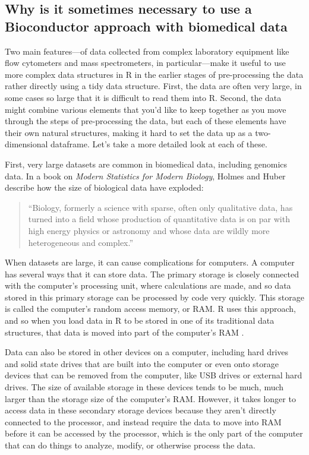 \documentclass[]{tufte-book}
\begin{document}
\subsection{Why is it sometimes necessary to use a Bioconductor approach with biomedical data}\label{why-is-it-sometimes-necessary-to-use-a-bioconductor-approach-with-biomedical-data}

Two main features---of data collected from complex laboratory equipment like
flow cytometers and mass spectrometers, in particular---make it useful to use
more complex data structures in R in the earlier stages of pre-processing the
data rather directly using a tidy data structure. First, the data are often very
large, in some cases so large that it is difficult to read them into R. Second,
the data might combine various elements that you'd like to keep together as you
move through the steps of pre-processing the data, but each of these elements
have their own natural structures, making it hard to set the data up as a
two-dimensional dataframe. Let's take a more detailed look at each of these.

First, very large datasets are common in biomedical data, including genomics
data. In a book on \emph{Modern Statistics for Modern Biology}, Holmes and Huber
describe how the size of biological data have exploded:

\begin{quote}
``Biology, formerly a science with sparse, often only qualitative data, has
turned into a field whose production of quantitative data is on par with high
energy physics or astronomy and whose data are wildly more heterogeneous and
complex.'' \citep{holmes2018modern}
\end{quote}

When datasets are large, it can cause complications for computers. A computer
has several ways that it can store data. The primary storage is closely
connected with the computer's processing unit, where calculations are made, and
so data stored in this primary storage can be processed by code very quickly.
This storage is called the computer's random access memory, or RAM. R uses this
approach, and so when you load data in R to be stored in one of its traditional
data structures, that data is moved into part of the computer's RAM
\citep{burns2011r, gillespie2016efficient}.

Data can also be stored in other devices on a computer, including hard drives
and solid state drives that are built into the computer or even onto storage
devices that can be removed from the computer, like USB drives or external hard
drives. The size of available storage in these devices tends to be much, much
larger than the storage size of the computer's RAM. However, it takes longer to
access data in these secondary storage devices because they aren't directly
connected to the processor, and instead require the data to move into RAM before
it can be accessed by the processor, which is the only part of the computer that
can do things to analyze, modify, or otherwise process the data.
\end{document}

